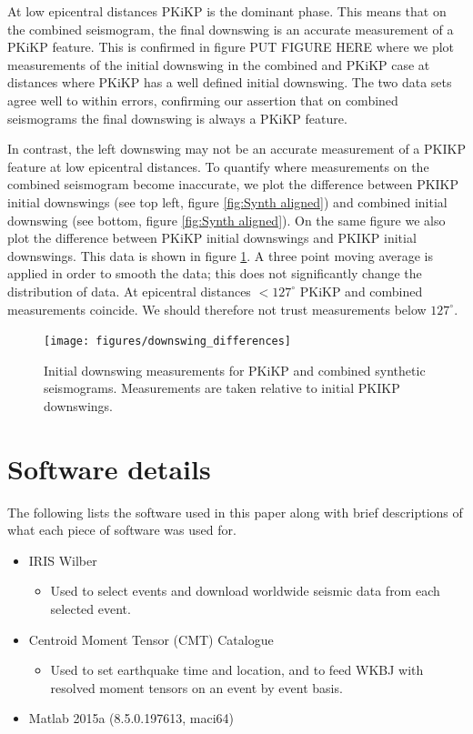 \documentclass[11pt,a4paper]{article}
\begin{document}
At low epicentral distances PKiKP is the dominant phase. This means that on the combined seismogram, the final downswing is an accurate measurement of a PKiKP feature. This is confirmed in figure PUT FIGURE HERE where we plot measurements of the initial downswing in the combined and PKiKP case at distances where PKiKP has a well defined initial downswing. The two data sets agree well to within errors, confirming our assertion that on combined seismograms the final downswing is always a PKiKP feature.

In contrast, the left downswing may not be an accurate measurement of a PKIKP feature at low epicentral distances. To quantify where measurements on the combined seismogram become inaccurate, we plot the difference between PKIKP initial downswings (see top left, figure \ref{fig:Synth aligned}) and combined initial downswing (see bottom, figure \ref{fig:Synth aligned}). On the same figure we also plot the difference between PKiKP initial downswings and PKIKP initial downswings. This data is shown in figure \ref{fig:Downswing differences}. A three point moving average is applied in order to smooth the data; this does not significantly change the distribution of data. At epicentral distances $< 127^{\circ}$ PKiKP and combined measurements coincide. We should therefore not trust measurements below $127^{\circ}$.

\begin{figure}
	\centering
	\texttt{[image: figures/downswing\_differences]}
	\caption{Initial downswing measurements for PKiKP and combined synthetic seismograms. Measurements are taken relative to initial PKIKP downswings.}
	\label{fig:Downswing differences}
\end{figure}



\appendix
\section{Software details}
\label{app:Software}
The following lists the software used in this paper along with brief descriptions of what each piece of software was used for.
\begin{itemize}
	\item IRIS Wilber
	\begin{itemize}
		\item Used to select events and download worldwide seismic data from each selected event.
	\end{itemize}
	\item Centroid Moment Tensor (CMT) Catalogue
	\begin{itemize}
		\item Used to set earthquake time and location, and to feed WKBJ with resolved moment tensors on an event by event basis.
	\end{itemize}
	\item Matlab 2015a (8.5.0.197613, maci64)
\end{itemize}

\newpage


\end{document}
